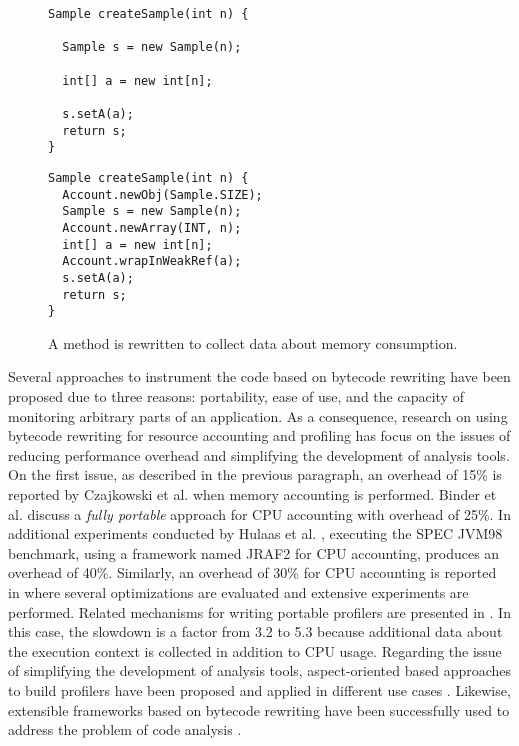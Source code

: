 \begin{figure}[ht]
\begin{minipage}[t]{0.45\textwidth}
\centering
\begin{lstlisting}
Sample createSample(int n) {

  Sample s = new Sample(n);

  int[] a = new int[n];

  s.setA(a);
  return s;
}
\end{lstlisting}
\end{minipage}
\hspace{0.2cm}
\begin{minipage}[t]{0.45\textwidth}
\begin{lstlisting}
Sample createSample(int n) {
  Account.newObj(Sample.SIZE);
  Sample s = new Sample(n);
  Account.newArray(INT, n);
  int[] a = new int[n];
  Account.wrapInWeakRef(a);
  s.setA(a);
  return s;
}
\end{lstlisting}
\end{minipage}
\caption{A method is rewritten to collect data about memory consumption.}\label{lst:bytecode-rewriting}
\end{figure}

Several approaches to instrument the code based on bytecode rewriting have been proposed due to three reasons: portability, ease of use, and the capacity of monitoring arbitrary parts of an application.
As a consequence, research on using bytecode rewriting for resource accounting and profiling has focus on the issues of reducing performance overhead and simplifying the development of analysis tools.
On the first issue, as described in the previous paragraph, an overhead of 15\% is reported by Czajkowski et al. \cite{czajkowski_jres:_1998} when memory accounting is performed.
Binder et al. \cite{binder_portable_2001} discuss a \textit{fully portable} approach for CPU accounting with overhead of 25\%.
In additional experiments conducted by Hulaas et al. \cite{Hulaas:2004:PTP:1014007.1014024,Hulaas:2008:PTL}, executing the SPEC JVM98 benchmark, using a framework named JRAF2 for CPU accounting, produces an overhead of 40\%.
Similarly, an overhead of 30\% for CPU accounting is reported in \cite{Binder200657,Hulaas:2008:PTL} where several optimizations are evaluated and extensive experiments are performed.
Related mechanisms for writing portable profilers are presented in \cite{Binder:2009:PPV:1464245.1464249,Binder200645}.
In this case, the slowdown is a factor from 3.2 to 5.3 because additional data about the execution context is collected in addition to CPU usage.  
Regarding the issue of simplifying the development of analysis tools, aspect-oriented based approaches to build profilers have been proposed and applied in different use cases \cite{Pearce:2007:PA:1248445.1248448,Ansaloni:2010:RDE:1712605.1712616}.
Likewise, extensible frameworks based on bytecode rewriting have been successfully used to address the problem of code analysis \cite{Binder:2006:FEM:1173706.1173733,Maebe06javana:a, Marek:2012:DEL:2162037.2162046}.

